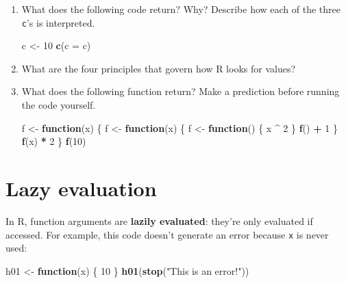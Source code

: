 \documentclass[]{book}
\newenvironment{Shaded}{\begin{snugshade}}{\end{snugshade}}
\newcommand{\ControlFlowTok}[1]{\textcolor[rgb]{0.13,0.29,0.53}{\textbf{#1}}}
\newcommand{\DataTypeTok}[1]{\textcolor[rgb]{0.13,0.29,0.53}{#1}}
\newcommand{\DecValTok}[1]{\textcolor[rgb]{0.00,0.00,0.81}{#1}}
\newcommand{\KeywordTok}[1]{\textcolor[rgb]{0.13,0.29,0.53}{\textbf{#1}}}
\newcommand{\NormalTok}[1]{#1}
\newcommand{\OperatorTok}[1]{\textcolor[rgb]{0.81,0.36,0.00}{\textbf{#1}}}
\newcommand{\StringTok}[1]{\textcolor[rgb]{0.31,0.60,0.02}{#1}}
\theoremstyle{definition}
\theoremstyle{definition}
\theoremstyle{definition}
\theoremstyle{remark}
\begin{document}
\begin{enumerate}
\def\labelenumi{\arabic{enumi}.}
\item
  What does the following code return? Why? Describe how each of the
  three \texttt{c}'s is interpreted.

\begin{Shaded}
\begin{Highlighting}[]
\NormalTok{c <-}\StringTok{ }\DecValTok{10}
\KeywordTok{c}\NormalTok{(}\DataTypeTok{c =}\NormalTok{ c)}
\end{Highlighting}
\end{Shaded}
\item
  What are the four principles that govern how R looks for values?
\item
  What does the following function return? Make a prediction before
  running the code yourself.

\begin{Shaded}
\begin{Highlighting}[]
\NormalTok{f <-}\StringTok{ }\ControlFlowTok{function}\NormalTok{(x) \{}
\NormalTok{  f <-}\StringTok{ }\ControlFlowTok{function}\NormalTok{(x) \{}
\NormalTok{    f <-}\StringTok{ }\ControlFlowTok{function}\NormalTok{() \{}
\NormalTok{      x }\OperatorTok{^}\StringTok{ }\DecValTok{2}
\NormalTok{    \}}
    \KeywordTok{f}\NormalTok{() }\OperatorTok{+}\StringTok{ }\DecValTok{1}
\NormalTok{  \}}
  \KeywordTok{f}\NormalTok{(x) }\OperatorTok{*}\StringTok{ }\DecValTok{2}
\NormalTok{\}}
\KeywordTok{f}\NormalTok{(}\DecValTok{10}\NormalTok{)}
\end{Highlighting}
\end{Shaded}
\end{enumerate}

\hypertarget{lazy-evaluation}{%
\section{Lazy evaluation}\label{lazy-evaluation}}

In R, function arguments are \textbf{lazily evaluated}: they're only
evaluated if accessed. For example, this code doesn't generate an error
because \texttt{x} is never used:

\begin{Shaded}
\begin{Highlighting}[]
\NormalTok{h01 <-}\StringTok{ }\ControlFlowTok{function}\NormalTok{(x) \{}
  \DecValTok{10}
\NormalTok{\}}
\KeywordTok{h01}\NormalTok{(}\KeywordTok{stop}\NormalTok{(}\StringTok{"This is an error!"}\NormalTok{))}
\end{Highlighting}
\end{Shaded}
\end{document}
